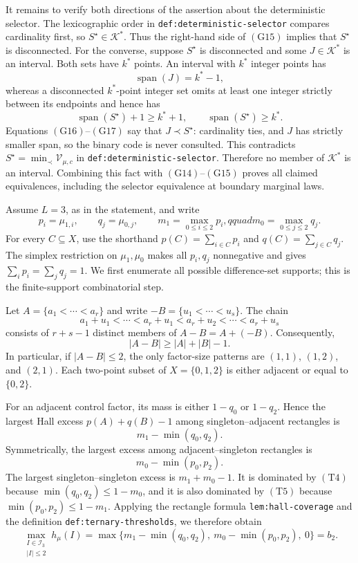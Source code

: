 It remains to verify both directions of the assertion about the deterministic selector.  The lexicographic order in \texttt{def:deterministic-selector} compares cardinality first, so \(S^\star\in\mathcal K^*\).  Thus the right-hand side of \((\mathrm{G15})\) implies that \(S^\star\) is disconnected.  For the converse, suppose \(S^\star\) is disconnected and some \(J\in\mathcal K^*\) is an interval.  Both sets have \(k^*\) points.  An interval with \(k^*\) integer points has
\[
\operatorname{span}(J)=k^*-1,
\tag{G16}
\]
whereas a disconnected \(k^*\)-point integer set omits at least one integer strictly between its endpoints and hence has
\[
\operatorname{span}(S^\star)+1\geq k^*+1,
\qquad
\operatorname{span}(S^\star)\geq k^*.
\tag{G17}
\]
Equations \((\mathrm{G16})\)--\((\mathrm{G17})\) say that \(J\prec S^\star\): cardinality ties, and \(J\) has strictly smaller span, so the binary code is never consulted.  This contradicts \(S^\star=\min_\prec\mathcal V_{\mu,c}\) in \texttt{def:deterministic-selector}.  Therefore no member of \(\mathcal K^*\) is an interval.  Combining this fact with \((\mathrm{G14})\)--\((\mathrm{G15})\) proves all claimed equivalences, including the selector equivalence at boundary marginal laws.

Assume \(L=3\), as in the statement, and write
\[
p_i=\mu_{1,i},\qquad q_j=\mu_{0,j},\qquad
m_1=\max_{0\leq i\leq2}p_i,qquad m_0=\max_{0\leq j\leq2}q_j.
\tag{T1}
\]
For every \(C\subseteq X\), use the shorthand \(p(C)=\sum_{i\in C}p_i\) and \(q(C)=\sum_{j\in C}q_j\).  The simplex restriction on \(\mu_1,\mu_0\) makes all \(p_i,q_j\) nonnegative and gives \(\sum_i p_i=\sum_jq_j=1\).  We first enumerate all possible difference-set supports; this is the finite-support combinatorial step.

Let \(A=\{a_1<\cdots<a_r\}\) and write \(-B=\{u_1<\cdots<u_s\}\).  The chain
\[
a_1+u_1<\cdots<a_r+u_1<a_r+u_2<\cdots<a_r+u_s
\tag{T2}
\]
consists of \(r+s-1\) distinct members of \(A-B=A+(-B)\).  Consequently,
\[
|A-B|\geq |A|+|B|-1.
\tag{T3}
\]
In particular, if \(|A-B|\leq2\), the only factor-size patterns are \((1,1)\), \((1,2)\), and \((2,1)\).  Each two-point subset of \(X=\{0,1,2\}\) is either adjacent or equal to \(\{0,2\}\).

For an adjacent control factor, its mass is either \(1-q_0\) or \(1-q_2\).  Hence the largest Hall excess \(p(A)+q(B)-1\) among singleton--adjacent rectangles is
\[
m_1-\min(q_0,q_2).
\tag{T4}
\]
Symmetrically, the largest excess among adjacent--singleton rectangles is
\[
m_0-\min(p_0,p_2).
\tag{T5}
\]
The largest singleton--singleton excess is \(m_1+m_0-1\).  It is dominated by \((\mathrm{T4})\) because \(\min(q_0,q_2)\leq1-m_0\), and it is also dominated by \((\mathrm{T5})\) because \(\min(p_0,p_2)\leq1-m_1\).  Applying the rectangle formula \texttt{lem:hall-coverage} and the definition \texttt{def:ternary-thresholds}, we therefore obtain
\[
\max_{\substack{I\in\mathcal I_3\\ |I|\leq2}}h_\mu(I)
=\max\{m_1-\min(q_0,q_2),\ m_0-\min(p_0,p_2),\ 0\}
=b_2.
\tag{T6}
\]

